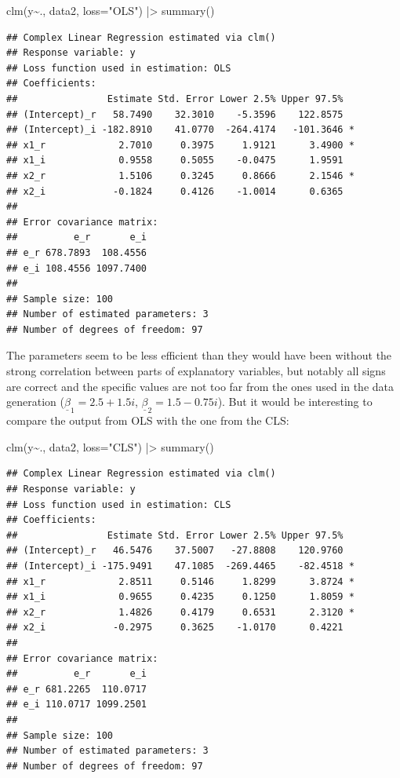 \documentclass[
]{book}
\newenvironment{Shaded}{\begin{snugshade}}{\end{snugshade}}
\newcommand{\AttributeTok}[1]{\textcolor[rgb]{0.77,0.63,0.00}{#1}}
\newcommand{\FunctionTok}[1]{\textcolor[rgb]{0.00,0.00,0.00}{#1}}
\newcommand{\NormalTok}[1]{#1}
\newcommand{\SpecialCharTok}[1]{\textcolor[rgb]{0.00,0.00,0.00}{#1}}
\newcommand{\StringTok}[1]{\textcolor[rgb]{0.31,0.60,0.02}{#1}}
\begin{document}
\begin{Shaded}
\begin{Highlighting}[]
\FunctionTok{clm}\NormalTok{(y}\SpecialCharTok{\textasciitilde{}}\NormalTok{., data2, }\AttributeTok{loss=}\StringTok{"OLS"}\NormalTok{) }\SpecialCharTok{|\textgreater{}}
    \FunctionTok{summary}\NormalTok{()}
\end{Highlighting}
\end{Shaded}

\begin{verbatim}
## Complex Linear Regression estimated via clm()
## Response variable: y
## Loss function used in estimation: OLS
## Coefficients:
##                Estimate Std. Error Lower 2.5% Upper 97.5%  
## (Intercept)_r   58.7490    32.3010    -5.3596    122.8575  
## (Intercept)_i -182.8910    41.0770  -264.4174   -101.3646 *
## x1_r             2.7010     0.3975     1.9121      3.4900 *
## x1_i             0.9558     0.5055    -0.0475      1.9591  
## x2_r             1.5106     0.3245     0.8666      2.1546 *
## x2_i            -0.1824     0.4126    -1.0014      0.6365  
## 
## Error covariance matrix:
##          e_r       e_i
## e_r 678.7893  108.4556
## e_i 108.4556 1097.7400
## 
## Sample size: 100
## Number of estimated parameters: 3
## Number of degrees of freedom: 97
\end{verbatim}

The parameters seem to be less efficient than they would have been without the strong correlation between parts of explanatory variables, but notably all signs are correct and the specific values are not too far from the ones used in the data generation (\(\underline{\beta}_1=2.5+1.5i\), \(\underline{\beta}_2=1.5-0.75i\)). But it would be interesting to compare the output from OLS with the one from the CLS:

\begin{Shaded}
\begin{Highlighting}[]
\FunctionTok{clm}\NormalTok{(y}\SpecialCharTok{\textasciitilde{}}\NormalTok{., data2, }\AttributeTok{loss=}\StringTok{"CLS"}\NormalTok{) }\SpecialCharTok{|\textgreater{}}
    \FunctionTok{summary}\NormalTok{()}
\end{Highlighting}
\end{Shaded}

\begin{verbatim}
## Complex Linear Regression estimated via clm()
## Response variable: y
## Loss function used in estimation: CLS
## Coefficients:
##                Estimate Std. Error Lower 2.5% Upper 97.5%  
## (Intercept)_r   46.5476    37.5007   -27.8808    120.9760  
## (Intercept)_i -175.9491    47.1085  -269.4465    -82.4518 *
## x1_r             2.8511     0.5146     1.8299      3.8724 *
## x1_i             0.9655     0.4235     0.1250      1.8059 *
## x2_r             1.4826     0.4179     0.6531      2.3120 *
## x2_i            -0.2975     0.3625    -1.0170      0.4221  
## 
## Error covariance matrix:
##          e_r       e_i
## e_r 681.2265  110.0717
## e_i 110.0717 1099.2501
## 
## Sample size: 100
## Number of estimated parameters: 3
## Number of degrees of freedom: 97
\end{verbatim}
\end{document}
